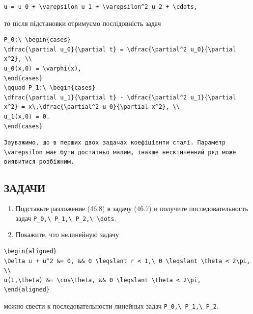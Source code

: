 \documentclass[
  ukrainian,
]{article}
\begin{document}
\begin{verbatim}
u = u_0 + \varepsilon u_1 + \varepsilon^2 u_2 + \cdots,
\end{verbatim}

то після підстановки отримуємо послідовність задач

\begin{verbatim}
P_0:\ \begin{cases}
\dfrac{\partial u_0}{\partial t} = \dfrac{\partial^2 u_0}{\partial x^2}, \\
u_0(x,0) = \varphi(x),
\end{cases}
\qquad P_1:\ \begin{cases}
\dfrac{\partial u_1}{\partial t} - \dfrac{\partial^2 u_1}{\partial x^2} = x\,\dfrac{\partial^2 u_0}{\partial x^2}, \\
u_1(x,0) = 0.
\end{cases}
\end{verbatim}

\begin{verbatim}
Зауважимо, що в перших двох задачах коефіцієнти сталі. Параметр \varepsilon має бути достатньо малим, інакше нескінченний ряд може виявитися розбіжним.
\end{verbatim}

\subsection{ЗАДАЧИ}\label{ux437ux430ux434ux430ux447ux438}

\begin{enumerate}
\def\labelenumi{\arabic{enumi}.}
\item
  Подставьте разложение (46.8) в задачу (46.7) и получите
  последовательность задач
  \texttt{P\_0,\textbackslash{}\ P\_1,\textbackslash{}\ P\_2,\textbackslash{}\ \textbackslash{}dots}.
\item
  Покажите, что нелинейную задачу
\end{enumerate}

\begin{verbatim}
\begin{aligned}
\Delta u + u^2 &= 0, && 0 \leqslant r < 1,\ 0 \leqslant \theta < 2\pi, \\
u(1,\theta) &= \cos\theta, && 0 \leqslant \theta < 2\pi,
\end{aligned}
\end{verbatim}

можно свести к последовательности линейных задач
\texttt{P\_0,\textbackslash{}\ P\_1,\textbackslash{}\ P\_2}.
\end{document}
